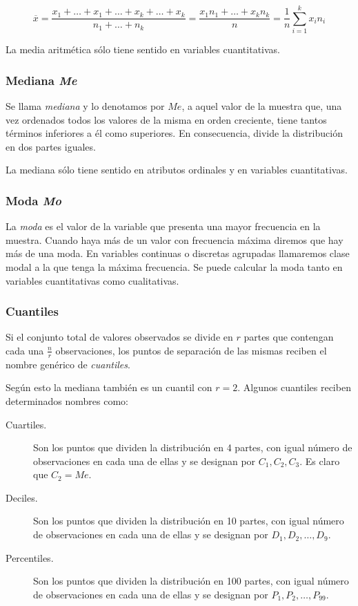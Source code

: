 \[\overline{x}=\frac{x_1+\ldots+x_1+\ldots+x_k+\ldots+x_k}{n_1+\ldots+n_k}=\frac{x_1n_1+\ldots+x_kn_k}{n}=\frac{1}{n}\sum_{i=1}^{k}x_in_i
\]

La media aritmética sólo tiene sentido en variables cuantitativas.

\subsubsection{Mediana \textit{Me}}
Se llama \emph{mediana} y lo denotamos por $Me$, a aquel valor de la
muestra que, una vez ordenados todos los valores de la misma en
orden creciente, tiene tantos términos inferiores a él como
superiores. En consecuencia, divide la distribución en dos partes
iguales.

La mediana sólo tiene sentido en atributos ordinales y en
variables cuantitativas.

\subsubsection{Moda \textit{Mo}}
La \emph{moda} es el valor de la variable que presenta una mayor
frecuencia en la muestra. Cuando haya más de un valor con frecuencia
máxima diremos que hay más de una moda. En variables continuas o
discretas agrupadas llamaremos clase modal a la que tenga la máxima
frecuencia. Se puede calcular la moda tanto en variables
cuantitativas como cualitativas.

\subsubsection{Cuantiles}
Si el conjunto total de valores observados se divide en $r$ partes
que contengan cada una $\frac{n}{r}$ observaciones, los puntos de
separación de las mismas reciben el nombre genérico de
\emph{cuantiles}.


Según esto la mediana también es un cuantil con $r=2$.
Algunos cuantiles reciben determinados nombres como:
\begin{description}

\item [Cuartiles.] Son los puntos que dividen la distribución en 4
partes, con igual número de observaciones en cada una de ellas y se 
designan por $C_1,C_2,C_3$. Es claro que $C_2=Me$.

\item[Deciles.] Son los puntos que dividen la distribución en 10
partes, con igual número de observaciones en cada una de ellas y
se designan por $D_1,D_2,\ldots,D_9$.

\item [Percentiles.] Son los puntos que dividen la distribución en
100 partes, con igual número de observaciones en cada una de ellas y
se designan por $P_1,P_2,\ldots,P_{99}$.
\end{description}

